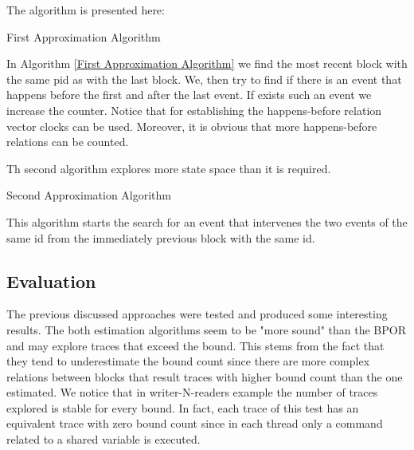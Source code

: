The algorithm is presented here:\\

\begin{algorithm}[H]
    \caption{First Approximation Algorithm}
    \label{First Approximation Algorithm}
\end{algorithm}

In Algorithm \ref{First Approximation Algorithm} we find the most recent block with the same pid as with the last block. We, then try to find if there is an event that happens before the first
and after the last event. If exists such an event we increase the counter.
Notice that for establishing the happens-before relation vector clocks can be used.
Moreover, it is obvious that more happens-before relations can be counted.


Th second algorithm explores more state space than it is required.\\

\begin{algorithm}[H]
    \caption{Second Approximation Algorithm}
\end{algorithm}

This algorithm starts the search for an event that intervenes the two events of the same id from the immediately previous block 
with the same id. 

\subsection{Evaluation}
The previous discussed approaches were tested and produced some interesting results. The both estimation algorithms seem to be "more sound" than the BPOR and
may explore traces that exceed the bound. This stems from the fact that they tend to underestimate the bound count since there are more complex relations 
between blocks that result traces with higher bound count than the one estimated. We notice that in writer-N-readers example the number of traces explored
is stable for every bound. In fact, each trace of this test has an equivalent trace with zero bound count since in each thread only a command related to
a shared variable is executed.

